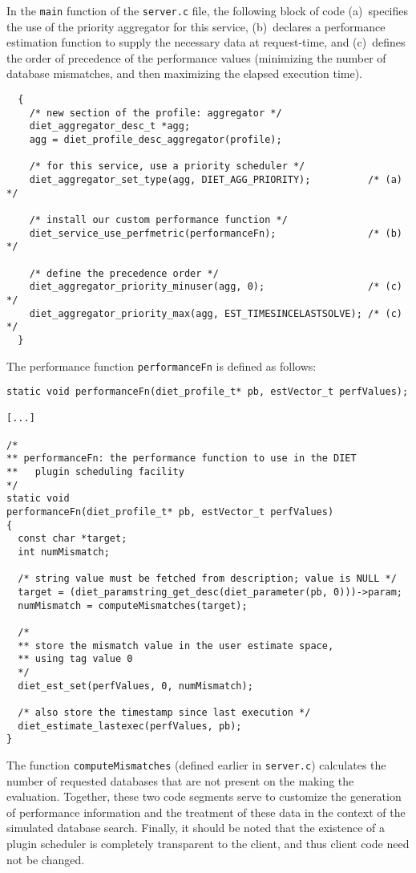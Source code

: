In the \texttt{main} function of the \texttt{server.c} file, the following
block of code (a)~specifies the use of the priority aggregator for this
service, (b)~declares a performance estimation function to supply the necessary
data at request-time, and (c)~defines the order of precedence of the
performance values (\ie minimizing the number of database mismatches, and then
maximizing the elapsed execution time).
\begin{verbatim}
  {
    /* new section of the profile: aggregator */
    diet_aggregator_desc_t *agg;
    agg = diet_profile_desc_aggregator(profile);

    /* for this service, use a priority scheduler */
    diet_aggregator_set_type(agg, DIET_AGG_PRIORITY);          /* (a) */

    /* install our custom performance function */
    diet_service_use_perfmetric(performanceFn);                /* (b) */

    /* define the precedence order */
    diet_aggregator_priority_minuser(agg, 0);                  /* (c) */
    diet_aggregator_priority_max(agg, EST_TIMESINCELASTSOLVE); /* (c) */
  }
\end{verbatim}
The performance function \texttt{performanceFn} is defined as follows:
\begin{verbatim}
static void performanceFn(diet_profile_t* pb, estVector_t perfValues);

[...]

/*
** performanceFn: the performance function to use in the DIET
**   plugin scheduling facility
*/
static void
performanceFn(diet_profile_t* pb, estVector_t perfValues)
{
  const char *target;
  int numMismatch;

  /* string value must be fetched from description; value is NULL */
  target = (diet_paramstring_get_desc(diet_parameter(pb, 0)))->param;
  numMismatch = computeMismatches(target);

  /*
  ** store the mismatch value in the user estimate space,
  ** using tag value 0
  */
  diet_est_set(perfValues, 0, numMismatch);

  /* also store the timestamp since last execution */
  diet_estimate_lastexec(perfValues, pb);
}
\end{verbatim}
The function \texttt{computeMismatches} (defined earlier in \texttt{server.c})
calculates the number of requested databases that are not present on the {\sed}
making the evaluation. Together, these two code segments serve to customize the
generation of performance information and the treatment of these data in the
context of the simulated database search. Finally, it should be noted that the
existence of a plugin scheduler is completely transparent to the client, and
thus client code need not be changed.

